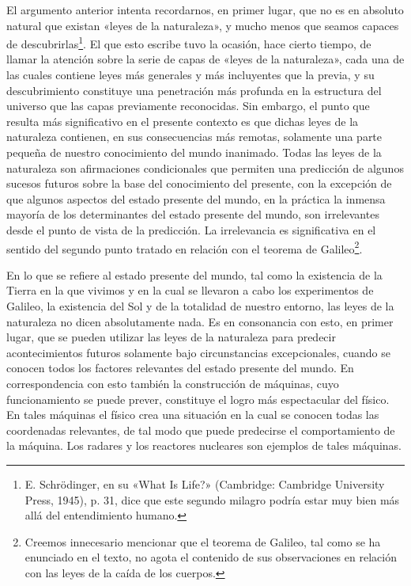 \documentclass[a4paper, 12pt]{article}
\begin{document}
El argumento anterior intenta recordarnos, en primer lugar, que no es en absoluto natural que existan «leyes de la naturaleza», y mucho menos que seamos capaces de descubrirlas\footnote{E. Schrödinger, en su «What Is Life?» (Cambridge: Cambridge University Press, 1945), p. 31, dice que este segundo milagro podría estar muy bien más allá del entendimiento humano.}. El que esto escribe tuvo la ocasión, hace cierto tiempo, de llamar la atención sobre la serie de capas de «leyes de la naturaleza», cada una de las cuales contiene leyes más generales y más incluyentes que la previa, y su descubrimiento constituye una penetración más profunda en la estructura del universo que las capas previamente reconocidas. Sin embargo, el punto que resulta más significativo en el presente contexto es que dichas leyes de la naturaleza contienen, en sus consecuencias más remotas, solamente una parte pequeña de nuestro conocimiento del mundo inanimado. Todas las leyes de la naturaleza son afirmaciones condicionales que permiten una predicción de algunos sucesos futuros sobre la base del conocimiento del presente, con la excepción de que algunos aspectos del estado presente del mundo, en la práctica la inmensa mayoría de los determinantes del estado presente del mundo, son irrelevantes desde el punto de vista de la predicción. La irrelevancia es significativa en el sentido del segundo punto tratado en relación con el teorema de Galileo\footnote{Creemos innecesario mencionar que el teorema de Galileo, tal como se ha enunciado en el texto, no agota el contenido de sus observaciones en relación con las leyes de la caída de los cuerpos.}.



En lo que se refiere al estado presente del mundo, tal como la existencia de la Tierra en la que vivimos y en la cual se llevaron a cabo los experimentos de Galileo, la existencia del Sol y de la totalidad de nuestro entorno, las leyes de la naturaleza no dicen absolutamente nada. Es en consonancia con esto, en primer lugar, que se pueden utilizar las leyes de la naturaleza para predecir acontecimientos futuros solamente bajo circunstancias excepcionales, cuando se conocen todos los factores relevantes del estado presente del mundo. En correspondencia con esto también la construcción de máquinas, cuyo funcionamiento se puede prever, constituye el logro más espectacular del físico. En tales máquinas el físico crea una situación en la cual se conocen todas las coordenadas relevantes, de tal modo que puede predecirse el comportamiento de la máquina. Los radares y los reactores nucleares son ejemplos de tales máquinas.
\end{document}

